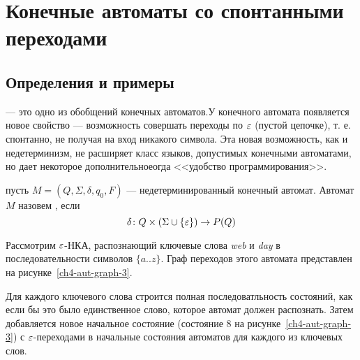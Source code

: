 \chapter{Конечные автоматы со спонтанными переходами}
\label{Chapter4}
\section{Определения и примеры}
\label{Chapter4Defines}
 --- это одно из обобщений конечных автоматов.У конечного автомата появляется новое свойство --- возможность совершать переходы по $\varepsilon$ (пустой цепочке), т. е. спонтанно, не получая на вход никакого символа. Эта новая возможность, как и недетерминизм, не расширяет класс языков, допустимых конечными автоматами, но дает некоторое дополнительноеогда  <<удобство программирования>>.

пусть $M = (Q,\Sigma, \delta, q_0, F)$ --- недетерминированный конечный автомат. Автомат $M$
назовем , если
\[
    \delta \colon Q \times (\Sigma \cup \{ \varepsilon \} ) \to P(Q)
\]


\begin{myexample}
Рассмотрим $\varepsilon$-НКА, распознающий ключевые слова \emph{web} и \emph{day} в последовательности символов $\{ a..z \}$. Граф переходов этого автомата представлен на рисунке~\ref{ch4-aut-graph-3}.

Для каждого ключевого слова строится полная последоватльность состояний, как если бы это было единственное слово, которое автомат должен распознать. Затем добавляется новое начальное состояние (состояние 8 на рисунке~\ref{ch4-aut-graph-3}) с $\varepsilon$-переходами в начальные состояния автоматов для каждого из ключевых слов.
\end{myexample}

